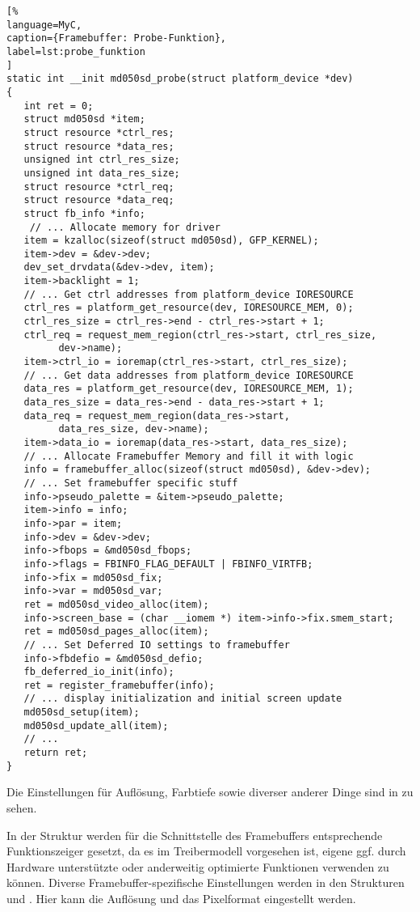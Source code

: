 \begin{lstlisting}[%
language=MyC,
caption={Framebuffer: Probe-Funktion},
label=lst:probe_funktion
]
static int __init md050sd_probe(struct platform_device *dev)
{
   int ret = 0;
   struct md050sd *item;
   struct resource *ctrl_res;
   struct resource *data_res;
   unsigned int ctrl_res_size;
   unsigned int data_res_size;
   struct resource *ctrl_req;
   struct resource *data_req;
   struct fb_info *info;
	// ... Allocate memory for driver
   item = kzalloc(sizeof(struct md050sd), GFP_KERNEL);
   item->dev = &dev->dev;
   dev_set_drvdata(&dev->dev, item);
   item->backlight = 1;
   // ... Get ctrl addresses from platform_device IORESOURCE
   ctrl_res = platform_get_resource(dev, IORESOURCE_MEM, 0);
   ctrl_res_size = ctrl_res->end - ctrl_res->start + 1;
   ctrl_req = request_mem_region(ctrl_res->start, ctrl_res_size,
         dev->name);
   item->ctrl_io = ioremap(ctrl_res->start, ctrl_res_size);
   // ... Get data addresses from platform_device IORESOURCE
   data_res = platform_get_resource(dev, IORESOURCE_MEM, 1);
   data_res_size = data_res->end - data_res->start + 1;
   data_req = request_mem_region(data_res->start,
         data_res_size, dev->name);
   item->data_io = ioremap(data_res->start, data_res_size);
   // ... Allocate Framebuffer Memory and fill it with logic
   info = framebuffer_alloc(sizeof(struct md050sd), &dev->dev);
   // ... Set framebuffer specific stuff
   info->pseudo_palette = &item->pseudo_palette;
   item->info = info;
   info->par = item;
   info->dev = &dev->dev;
   info->fbops = &md050sd_fbops;
   info->flags = FBINFO_FLAG_DEFAULT | FBINFO_VIRTFB;
   info->fix = md050sd_fix;
   info->var = md050sd_var;
   ret = md050sd_video_alloc(item);
   info->screen_base = (char __iomem *) item->info->fix.smem_start;
   ret = md050sd_pages_alloc(item);
   // ... Set Deferred IO settings to framebuffer
   info->fbdefio = &md050sd_defio;
   fb_deferred_io_init(info);
   ret = register_framebuffer(info);
   // ... display initialization and initial screen update
   md050sd_setup(item);
   md050sd_update_all(item);
   // ...
   return ret;
}
\end{lstlisting}
Die Einstellungen für Auflösung, Farbtiefe sowie diverser anderer Dinge sind in  zu sehen. 

In der Struktur  werden für die Schnittstelle des Framebuffers entsprechende Funktionszeiger gesetzt, da es im Treibermodell vorgesehen ist, eigene ggf. durch Hardware unterstützte oder anderweitig optimierte Funktionen verwenden zu können. Diverse Framebuffer-spezifische Einstellungen werden in den Strukturen  und . Hier kann die Auflösung und das Pixelformat eingestellt werden. 

